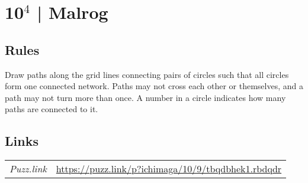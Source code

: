 \section[10$^4$ | Malrog {[\emph{Ichimaga}]}]{10$^4$ | {\normalfont Malrog}}
\label{sec:11-10-4-malrog}

\subsection*{Rules}
\begin{markdown}
Draw paths along the grid lines connecting pairs of circles such that all circles form one connected network. Paths may not cross each other or themselves, and a path may not turn more than once. A number in a circle indicates how many paths are connected to it.
\end{markdown}
\subsection*{Links}
\begin{tabularx}{\textwidth}{l X}
\emph{Puzz.link} & \url{https://puzz.link/p?ichimaga/10/9/tbqdbhek1.rbdqdr} \\
\end{tabularx}
\pagebreak
